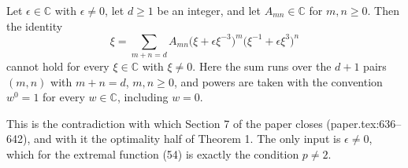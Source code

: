 \begin{lemma}
Let $\epsilon\in\mathbb{C}$ with $\epsilon\neq0$, let $d\ge1$ be an integer, and
let $A_{mn}\in\mathbb{C}$ for $m,n\ge0$.  Then the identity
\begin{equation}\tag{60}
  \xi=\sum_{m+n=d}A_{mn}
    \bigl(\xi+\epsilon\xi^{-3}\bigr)^{m}
    \bigl(\xi^{-1}+\epsilon\xi^{3}\bigr)^{n}
\end{equation}
cannot hold for every $\xi\in\mathbb{C}$ with $\xi\neq0$.  Here the sum runs
over the $d+1$ pairs $(m,n)$ with $m+n=d$, $m,n\ge0$, and powers are taken with
the convention $w^{0}=1$ for every $w\in\mathbb{C}$, including $w=0$.

This is the contradiction with which Section 7 of the paper closes
(paper.tex:636--642), and with it the optimality half of Theorem 1.  The only
input is $\epsilon\neq0$, which for the extremal function (54) is exactly the
condition $p\neq2$.
\end{lemma}
